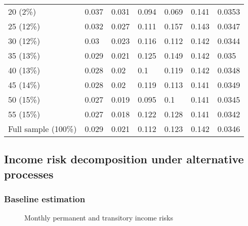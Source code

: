 \begin{table}[!ht]
\begin{tabular}{lllllll}
20 (2\%)             & 0.037         & 0.031                 & 0.094                   & 0.069             & 0.141         & 0.0353       \\
25 (12\%)            & 0.032         & 0.027                 & 0.111                   & 0.157             & 0.143         & 0.0347       \\
30 (12\%)            & 0.03          & 0.023                 & 0.116                   & 0.112             & 0.142         & 0.0344       \\
35 (13\%)            & 0.029         & 0.021                 & 0.125                   & 0.149             & 0.142         & 0.035        \\
40 (13\%)            & 0.028         & 0.02                  & 0.1                     & 0.119             & 0.142         & 0.0348       \\
45 (14\%)            & 0.028         & 0.02                  & 0.119                   & 0.113             & 0.141         & 0.0349       \\
50 (15\%)            & 0.027         & 0.019                 & 0.095                   & 0.1               & 0.141         & 0.0345       \\
55 (15\%)            & 0.027         & 0.018                 & 0.122                   & 0.128             & 0.141         & 0.0342       \\ \hline 
Full sample (100\%)        & 0.029         & 0.021                 & 0.112                   & 0.123             & 0.142         & 0.0346    \\   
\hline\hline 
\end{tabular}

\end{table}

\subsection{Income risk decomposition under alternative processes}

\subsubsection{Baseline estimation}

 \begin{figure}[!ht]
    	\caption{Monthly permanent and transitory income risks}
    	\label{fig:decomposed_monthly}
    	\begin{center}
    	\end{center}
    \end{figure}
    
